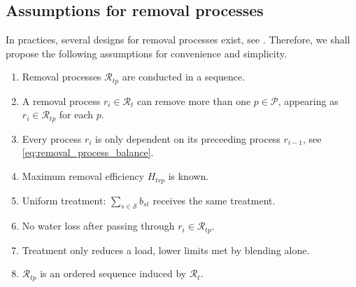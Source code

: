 \subsection{Assumptions for removal processes}
\label{sec:removal_process_axiom}
In practices, several designs for removal processes exist, see \cite{lower_murray_water2023, zouboulis2005improvement}. Therefore, we shall propose the following assumptions for convenience and simplicity.
\begin{enumerate}[label=(\roman*), align=left, widest=viii]
    \item Removal processes $\mathcal R_{tp}$ are conducted in a sequence.
    \item A removal process $r_i \in \mathcal R_{t}$ can remove more than one $p \in \mathcal P$, appearing as $r_i \in \mathcal R_{tp}$ for each $p$.
    \item Every process $r_i$ is only dependent on its preceeding process $r_{i - 1}$, see \eqref{eq:removal_process_balance}.
    \item Maximum removal efficiency $H_{trp}$ is known.
    \item Uniform treatment: $\sum_{s \in \mathcal S} b_{st}$ receives the same treatment.
    \item No water loss after passing through $r_i \in \mathcal R_{tp}$.
    \item Treatment only reduces a load, lower limits met by blending alone.
    \item $\mathcal{R}_{tp}$ is an ordered sequence induced by $\mathcal{R}_{t}$.
\end{enumerate}

